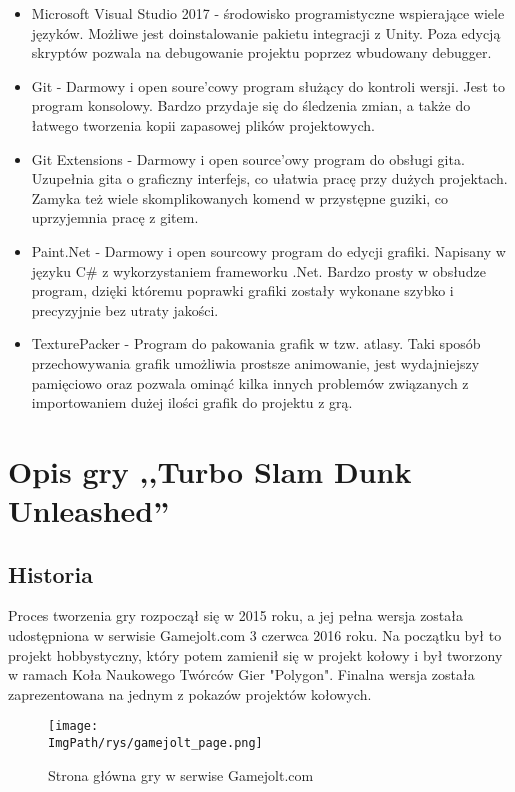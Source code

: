 \documentclass[a4paper,12pt,twoside,openany]{report}
\newcommand{\ImgPath}{.}
\begin{document}
\begin{itemize}
    \item Microsoft Visual Studio 2017 - środowisko programistyczne wspierające wiele języków. Możliwe jest doinstalowanie pakietu integracji z Unity. Poza edycją skryptów pozwala na debugowanie projektu poprzez wbudowany debugger.
    \item Git - Darmowy i open soure'cowy program służący do kontroli wersji. Jest to program konsolowy. Bardzo przydaje się do śledzenia zmian, a także do łatwego tworzenia kopii zapasowej plików projektowych.
    \item Git Extensions - Darmowy i open source'owy program do obsługi gita. Uzupełnia gita o graficzny interfejs, co ułatwia pracę przy dużych projektach. Zamyka też wiele skomplikowanych komend w przystępne guziki, co uprzyjemnia pracę z gitem.
    \item Paint.Net - Darmowy i open sourcowy program do edycji grafiki. Napisany w języku C\# z wykorzystaniem frameworku .Net. Bardzo prosty w obsłudze program, dzięki któremu poprawki grafiki zostały wykonane szybko i precyzyjnie bez utraty jakości.
    \item TexturePacker - Program do pakowania grafik w tzw. atlasy. Taki sposób przechowywania grafik umożliwia prostsze animowanie, jest wydajniejszy pamięciowo oraz pozwala ominąć kilka innych problemów związanych z importowaniem dużej ilości grafik do projektu z grą.
\end{itemize}

\chapter{Opis gry ,,Turbo Slam Dunk Unleashed''}

\section{Historia}

Proces tworzenia gry rozpoczął się w 2015 roku, a jej pełna wersja została udostępniona w serwisie Gamejolt.com 3 czerwca 2016 roku\cite{gamejolt_page}. Na początku był to projekt hobbystyczny, który potem zamienił się w projekt kołowy i był tworzony w ramach Koła Naukowego Twórców Gier "Polygon". Finalna wersja została zaprezentowana na jednym z pokazów projektów kołowych.
\begin{figure}[!htbp]
	\begin{center}
\centering
\texttt{[image: \\ImgPath/rys/gamejolt\_page.png]}
\end{center}
	\caption{Strona główna gry w serwise Gamejolt.com}
	\label{gamejolt_page}
\end{figure}
\end{document}
